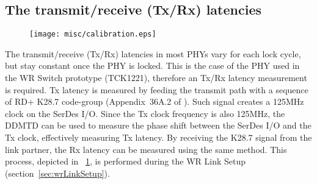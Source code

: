 
\subsection{The transmit/receive (Tx/Rx) latencies} 
\label{sec:TxRxLatencies}

\begin{figure}[!t]
\centering
\texttt{[image: misc/calibration.eps]}
\caption{}
\label{fig:calibration}
\end{figure}

The transmit/receive (Tx/Rx) latencies in most PHYs vary for
each  
lock cycle, but stay constant once the PHY is
locked. This is the case of the PHY used in the WR Switch prototype
(TCK1221), therefore an Tx/Rx latency measurement is required. Tx
latency is measured by feeding the transmit path with a sequence of
RD+ K28.7 code-group (Appendix~36A.2 of \cite{biblio:IEEE8023}). 
Such signal creates a 125MHz clock on
the SerDes I/O. Since the Tx clock frequency is also 125MHz, the DDMTD
can be used to measure the phase shift between the SerDes I/O and the
Tx clock, effectively measuring Tx latency. By receiving the K28.7
signal from the link partner, the Rx latency can be measured using the
same method. This process, depicted in \figurename~\ref{fig:calibration},
is performed during the WR Link Setup (section~\ref{sec:wrLinkSetup}).


